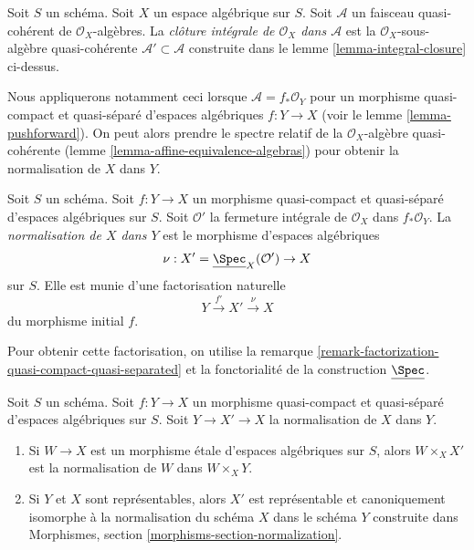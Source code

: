 \begin{definition}
\label{definition-integral-closure}
Soit $S$ un schéma. Soit $X$ un espace algébrique sur $S$.
Soit $\mathcal{A}$ un faisceau quasi-cohérent de $\mathcal{O}_X$-algèbres.
La {\it clôture intégrale de $\mathcal{O}_X$ dans $\mathcal{A}$} est la
$\mathcal{O}_X$-sous-algèbre quasi-cohérente $\mathcal{A}' \subset \mathcal{A}$
construite dans le lemme \ref{lemma-integral-closure} ci-dessus.
\end{definition}

\noindent
Nous appliquerons notamment ceci lorsque $\mathcal{A} = f_*\mathcal{O}_Y$
pour un morphisme quasi-compact et quasi-séparé d'espaces algébriques
$f : Y \to X$ (voir le lemme \ref{lemma-pushforward}). On peut alors prendre
le spectre relatif de la $\mathcal{O}_X$-algèbre quasi-cohérente
(lemme \ref{lemma-affine-equivalence-algebras}) pour obtenir la
normalisation de $X$ dans $Y$.

\begin{definition}
\label{definition-normalization-X-in-Y}
Soit $S$ un schéma. Soit $f : Y \to X$ un morphisme quasi-compact et quasi-séparé
d'espaces algébriques sur $S$. Soit $\mathcal{O}'$ la fermeture
intégrale de $\mathcal{O}_X$ dans $f_*\mathcal{O}_Y$. La {\it normalisation de
$X$ dans $Y$} est le morphisme d'espaces algébriques
$$
\nu : X' = \underline{\Spec}_X(\mathcal{O}') \to X
$$
sur $S$. Elle est munie d'une factorisation naturelle
$$
Y \xrightarrow{f'} X' \xrightarrow{\nu} X
$$
du morphisme initial $f$.
\end{definition}

\noindent
Pour obtenir cette factorisation, on utilise la remarque
\ref{remark-factorization-quasi-compact-quasi-separated}
et la fonctorialité de la construction $\underline{\Spec}$.

\begin{lemma}
\label{lemma-properties-normalization}
Soit $S$ un schéma. Soit $f : Y \to X$ un morphisme quasi-compact et quasi-séparé
d'espaces algébriques sur $S$. Soit $Y \to X' \to X$ la
normalisation de $X$ dans $Y$.
\begin{enumerate}
\item Si $W \to X$ est un morphisme étale d'espaces algébriques sur $S$,
alors $W \times_X X'$ est la normalisation de $W$ dans $W \times_X Y$.
\item Si $Y$ et $X$ sont représentables, alors $X'$ est représentable
et canoniquement isomorphe à la normalisation du schéma $X$
dans le schéma $Y$ construite dans
Morphismes, section \ref{morphisms-section-normalization}.
\end{enumerate}
\end{lemma}


